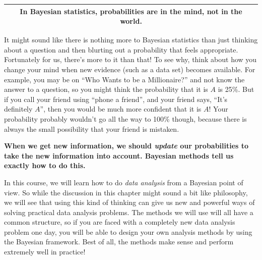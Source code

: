 \begin{center}
\begin{tabular}{|c|}
\hline
{\bf In Bayesian statistics, probabilities are in the mind, not in the world.}\\
\hline
\end{tabular}
\end{center}

It might sound like there is nothing more to Bayesian statistics than just
thinking about a question and then blurting out a probability that feels
appropriate. Fortunately for us, there's more to it than that! To see why, think
about how you change your mind when new evidence (such as a data set) becomes
available. For example, you may be on ``Who Wants to be a Millionaire?'' and
not know the answer to a question, so you might think the probability that it is
$A$ is 25\%. But if you call your friend using ``phone a friend'', and
your friend says,
``It's definitely $A$'', then you would be much more confident that it is $A$!
Your probability probably wouldn't go all the way to 100\% though, because there
is always the small possibility that your friend is mistaken.\\

\begin{framed}
{\bf When we get new information, we should {\it update} our probabilities to
take the new information into account. Bayesian methods tell us exactly how to
do this.}
\end{framed}

In this course, we will learn how to do {\it data analysis} from a Bayesian
point of view. So while the discussion in this chapter might sound a bit
like philosophy, we will see that using this kind of thinking can give us
new and powerful ways of solving practical data analysis problems. The methods we will use
will all have a common structure, so if you are faced with a completely new
data analysis problem one day, you will be able to design your own analysis
methods by using the Bayesian framework. Best of all, the methods make sense
and perform extremely well in practice!


